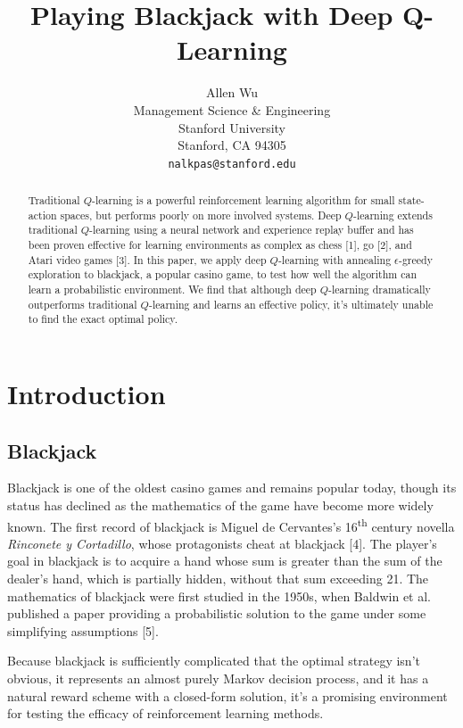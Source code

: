 \documentclass{article}
\title{Playing Blackjack with Deep Q-Learning}
\author{
  Allen Wu\\
  Management Science \& Engineering\\
  Stanford University\\
  Stanford, CA 94305 \\
  \texttt{nalkpas@stanford.edu} \\
}
\begin{document}
\maketitle

\begin{abstract}
  Traditional $Q$-learning is a powerful reinforcement learning algorithm for small state-action spaces, but performs poorly on more involved systems. Deep $Q$-learning extends traditional $Q$-learning using a neural network and experience replay buffer and has been proven effective for learning environments as complex as chess [1], go [2], and Atari video games [3]. In this paper, we apply deep $Q$-learning with annealing $\epsilon$-greedy exploration to blackjack, a popular casino game, to test how well the algorithm can learn a probabilistic environment. We find that although deep $Q$-learning dramatically outperforms traditional $Q$-learning and learns an effective policy, it's ultimately unable to find the exact optimal policy. 
\end{abstract}

\section{Introduction}

\subsection{Blackjack}

Blackjack is one of the oldest casino games and remains popular today, though its status has declined as the mathematics of the game have become more widely known. The first record of blackjack is Miguel de Cervantes's 16\textsuperscript{th} century novella \textit{Rinconete y Cortadillo}, whose protagonists cheat at blackjack [4]. The player's goal in blackjack is to acquire a hand whose sum is greater than the sum of the dealer's hand, which is partially hidden, without that sum exceeding 21. The mathematics of blackjack were first studied in the 1950s, when Baldwin et al. published a paper providing a probabilistic solution to the game under some simplifying assumptions [5]. 

Because blackjack is sufficiently complicated that the optimal strategy isn't obvious, it represents an almost purely Markov decision process, and it has a natural reward scheme with a closed-form solution, it's a promising environment for testing the efficacy of reinforcement learning methods.
\end{document}
